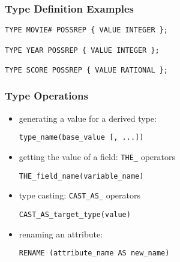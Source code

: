\documentclass[dvipsnames]{beamer}
\theoremstyle{plain}
\begin{document}
\begin{frame}[fragile]
  \frametitle{Type Definition Examples}

  \begin{example}
    \begin{lstlisting}
TYPE MOVIE# POSSREP { VALUE INTEGER };

TYPE YEAR POSSREP { VALUE INTEGER };

TYPE SCORE POSSREP { VALUE RATIONAL };
    \end{lstlisting}
  \end{example}
\end{frame}

\begin{frame}[fragile]
  \frametitle{Type Operations}

  \begin{itemize}
    \item generating a value for a derived type:
    \begin{lstlisting}
type_name(base_value [, ...])
    \end{lstlisting}

    \pause
    \item getting the value of a field: \lstinline!THE_! operators
    \begin{lstlisting}
THE_field_name(variable_name)
    \end{lstlisting}

    \pause
    \item type casting: \lstinline!CAST_AS_! operators
    \begin{lstlisting}
CAST_AS_target_type(value)
    \end{lstlisting}

    \pause
    \item renaming an attribute:
    \begin{lstlisting}
RENAME (attribute_name AS new_name)
    \end{lstlisting}
  \end{itemize}
\end{frame}
\end{document}
